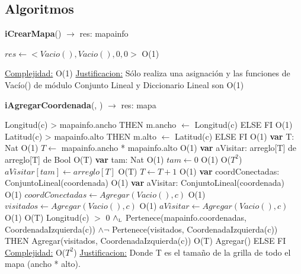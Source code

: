 \subsection{Algoritmos}
\begin{Algoritmos}

\begin{algorithm}[H]{\textbf{iCrearMapa}() $\to$ res: mapainfo}
	\begin{algorithmic}[1]
		\State $res \gets <Vacio(), Vacio(), 0, 0>$ \Comment O(1)

		\medskip
		\Statex \underline{Complejidad:} O(1)
			\Statex \underline{Justificacion:} Sólo realiza una asignación y las funciones de Vac\'io() de m\'odulo Conjunto Lineal y Diccionario Lineal son O(1)
	\end{algorithmic}
\end{algorithm}

\begin{algorithm}[H]{\textbf{iAgregarCoordenada}(, ) $\to$ res: mapa}
	\begin{algorithmic}[1]
		\State \IF Longitud(c) > mapainfo.ancho THEN m.ancho $\gets$ Longitud(c) ELSE FI \Comment O(1)
		\State \IF Latitud(c) > mapainfo.alto THEN m.alto $\gets$ Latitud(c) ELSE FI \Comment O(1)
		\State \textbf{var} T: Nat \Comment O(1)
		\State $T \gets$ mapainfo.ancho * mapainfo.alto \Comment O(1)
		\State \textbf{var} aVisitar: arreglo[T] de arreglo[T] de Bool \Comment O(T)
		\State \textbf{var} tam: Nat \Comment O(1)
		\State $tam \gets 0$ \Comment O(1)
		 \Comment O($T^2$)
			\State $aVisitar[tam] \gets arreglo[T]$ \Comment O(T)
			\State $T \gets T + 1$ \Comment O(1)
		\EndWhile
		\State \textbf{var} coordConectadas: ConjuntoLineal(coordenada) \Comment O(1)
		\State \textbf{var} aVisitar: ConjuntoLineal(coordenada) \Comment O(1)
		\State $coordConectadas \gets Agregar(Vacio(), c)$ \Comment O(1)
		\State $visitados \gets Agregar(Vacio(), c)$ \Comment O(1)
		\State $aVisitar \gets Agregar(Vacio(), c)$ \Comment O(1)
		 \Comment O(T)
			\State \IF Longitud(c) $>$ 0 $\land_{\mathrm{\scriptscriptstyle{L}}}$ Pertenece(mapainfo.coordenadas, CoordenadaIzquierda(c)) $\wedge \neg$ Pertenece(visitados, CoordenadaIzquierda(c)) THEN
			 Agregar(visitados, CoordenadaIzquierda(c)) \Comment O(T)
			 Agregar()
			 ELSE FI
		\EndWhile
		\medskip
		\Statex \underline{Complejidad:} O($T^2$)
		\Statex \underline{Justificacion:} Donde T es el tamaño de la grilla de todo el mapa (ancho * alto).
	\end{algorithmic}
\end{algorithm}


\end{Algoritmos}
